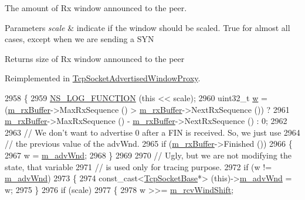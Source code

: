The amount of Rx window announced to the peer. 


\begin{DoxyParams}{Parameters}
{\em scale} & indicate if the window should be scaled. True for almost all cases, except when we are sending a S\+YN \\
\hline
\end{DoxyParams}
\begin{DoxyReturn}{Returns}
size of Rx window announced to the peer 
\end{DoxyReturn}


Reimplemented in \hyperlink{classTcpSocketAdvertisedWindowProxy_a79348b8b48a47b87d0dcaa59b3d8ee1d}{Tcp\+Socket\+Advertised\+Window\+Proxy}.


\begin{DoxyCode}
2958 \{
2959   \hyperlink{log-macros-disabled_8h_a90b90d5bad1f39cb1b64923ea94c0761}{NS\_LOG\_FUNCTION} (\textcolor{keyword}{this} << scale);
2960   uint32\_t \hyperlink{lte_2model_2fading-traces_2fading__trace__generator_8m_afd61ec66f9d7b807eece6eb12c781844}{w} = (\hyperlink{classns3_1_1TcpSocketBase_a0163894148e5a70e6bd89970a1483fae}{m\_rxBuffer}->MaxRxSequence () > \hyperlink{classns3_1_1TcpSocketBase_a0163894148e5a70e6bd89970a1483fae}{m\_rxBuffer}->NextRxSequence ()) ?
2961     \hyperlink{classns3_1_1TcpSocketBase_a0163894148e5a70e6bd89970a1483fae}{m\_rxBuffer}->MaxRxSequence () - \hyperlink{classns3_1_1TcpSocketBase_a0163894148e5a70e6bd89970a1483fae}{m\_rxBuffer}->NextRxSequence () : 0;
2962 
2963   \textcolor{comment}{// We don't want to advertise 0 after a FIN is received. So, we just use}
2964   \textcolor{comment}{// the previous value of the advWnd.}
2965   \textcolor{keywordflow}{if} (\hyperlink{classns3_1_1TcpSocketBase_a0163894148e5a70e6bd89970a1483fae}{m\_rxBuffer}->Finished ())
2966     \{
2967       w = \hyperlink{classns3_1_1TcpSocketBase_a12a1c017e48895fbe36df0d54a509041}{m\_advWnd};
2968     \}
2969 
2970   \textcolor{comment}{// Ugly, but we are not modifying the state, that variable}
2971   \textcolor{comment}{// is used only for tracing purpose.}
2972   \textcolor{keywordflow}{if} (w != \hyperlink{classns3_1_1TcpSocketBase_a12a1c017e48895fbe36df0d54a509041}{m\_advWnd})
2973     \{
2974       \textcolor{keyword}{const\_cast<}\hyperlink{classns3_1_1TcpSocketBase_a89e51540a8ac03d929349ae2ec56239b}{TcpSocketBase}*\textcolor{keyword}{>} (\textcolor{keyword}{this})->\hyperlink{classns3_1_1TcpSocketBase_a12a1c017e48895fbe36df0d54a509041}{m\_advWnd} = w;
2975     \}
2976   \textcolor{keywordflow}{if} (scale)
2977     \{
2978       w >>= \hyperlink{classns3_1_1TcpSocketBase_a045fc4c0c16f906c5ec43d853cdb599f}{m\_rcvWindShift};

\end{DoxyCode}
